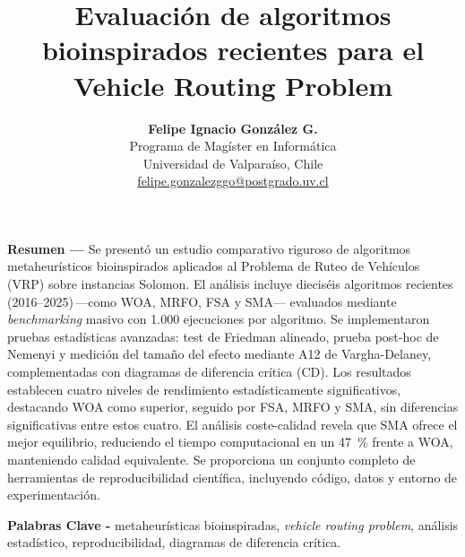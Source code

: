 \documentclass[10pt,a4paper]{extarticle}
\begin{document}
\title{Evaluación de algoritmos bioinspirados recientes para el Vehicle Routing Problem}
\author{%
  \begin{tabular}{c}
    \textbf{Felipe Ignacio González G.}\\
    Programa de Magíster en Informática\\
    Universidad de Valparaíso, Chile\\
    \href{mailto:felipe.gonzalezggo@postgrado.uv.cl}{felipe.gonzalezggo@postgrado.uv.cl}
  \end{tabular}}
\date{}
\maketitle

{\small
\noindent\textbf{Resumen ---} Se presentó un estudio comparativo riguroso de algoritmos metaheurísticos bioinspirados aplicados al Problema de Ruteo de Vehículos (VRP) sobre instancias Solomon. El análisis incluye dieciséis algoritmos recientes (2016--2025)\,—como WOA, MRFO, FSA y SMA— evaluados mediante \textit{benchmarking} masivo con 1.000 ejecuciones por algoritmo. Se implementaron pruebas estadísticas avanzadas: test de Friedman alineado, prueba post-hoc de Nemenyi y medición del tamaño del efecto mediante A12 de Vargha-Delaney, complementadas con diagramas de diferencia crítica (CD). Los resultados establecen cuatro niveles de rendimiento estadísticamente significativos, destacando WOA como superior, seguido por FSA, MRFO y SMA, sin diferencias significativas entre estos cuatro. El análisis coste-calidad revela que SMA ofrece el mejor equilibrio, reduciendo el tiempo computacional en un 47~\% frente a WOA, manteniendo calidad equivalente. Se proporciona un conjunto completo de herramientas de reproducibilidad científica, incluyendo código, datos y entorno de experimentación.

\noindent\textbf{Palabras Clave -} metaheurísticas bioinspiradas, \textit{vehicle routing problem}, análisis estadístico, reproducibilidad, diagramas de diferencia crítica.
}
\end{document}
